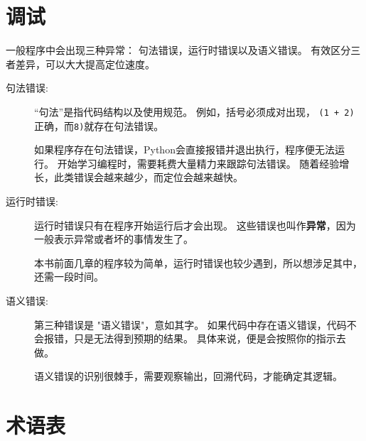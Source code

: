 \documentclass[10pt]{book}
\begin{document}
\section{调试}

一般程序中会出现三种异常：
句法错误，运行时错误以及语义错误。
有效区分三者差异，可以大大提高定位速度。

\begin{description}

\item[句法错误:] “句法”是指代码结构以及使用规范。
例如，括号必须成对出现，
{\tt (1 + 2)}正确，而{\tt 8)}就存在句法错误。

如果程序存在句法错误，Python会直接报错并退出执行，程序便无法运行。
开始学习编程时，需要耗费大量精力来跟踪句法错误。
随着经验增长，此类错误会越来越少，而定位会越来越快。


\item[运行时错误:] 运行时错误只有在程序开始运行后才会出现。
这些错误也叫作{\bf 异常}，因为一般表示异常或者坏的事情发生了。
 
    

本书前面几章的程序较为简单，运行时错误也较少遇到，所以想涉足其中，还需一段时间。

\item[语义错误:] 第三种错误是 "语义错误"，意如其字。
如果代码中存在语义错误，代码不会报错，只是无法得到预期的结果。
具体来说，便是会按照你的指示去做。
   

语义错误的识别很棘手，需要观察输出，回溯代码，才能确定其逻辑。

\end{description}


\section{术语表}
\end{document}
